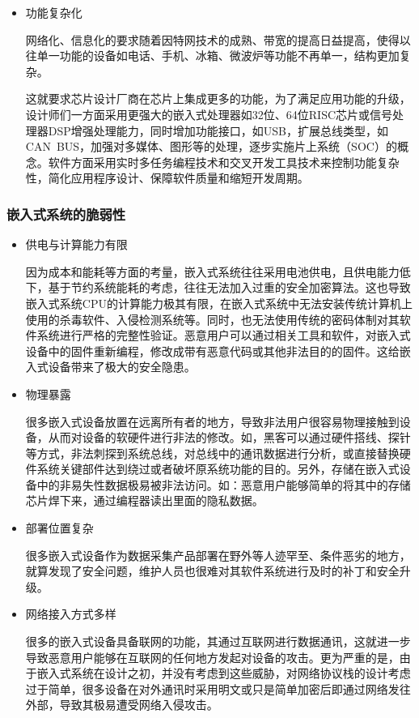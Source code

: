 \documentclass[12pt, a4paper]{article}
\begin{document}
\begin{itemize}
		\item 功能复杂化
		
		网络化、信息化的要求随着因特网技术的成熟、带宽的提高日益提高，使得以往单一功能的设备如电话、手机、冰箱、微波炉等功能不再单一，结构更加复杂。
		
		这就要求芯片设计厂商在芯片上集成更多的功能，为了满足应用功能的升级，设计师们一方面采用更强大的嵌入式处理器如32位、64位RISC芯片或信号处理器DSP增强处理能力，同时增加功能接口，如USB，扩展总线类型，如CAN BUS，加强对多媒体、图形等的处理，逐步实施片上系统（SOC）的概念。软件方面采用实时多任务编程技术和交叉开发工具技术来控制功能复杂性，简化应用程序设计、保障软件质量和缩短开发周期。
	\end{itemize}
	
	\subsubsection{嵌入式系统的脆弱性}
	\begin{itemize}
		\item 供电与计算能力有限
		
		因为成本和能耗等方面的考量，嵌入式系统往往采用电池供电，且供电能力低下，基于节约系统能耗的考虑，往往无法加入过重的安全加密算法。这也导致嵌入式系统CPU的计算能力极其有限，在嵌入式系统中无法安装传统计算机上使用的杀毒软件、入侵检测系统等。同时，也无法使用传统的密码体制对其软件系统进行严格的完整性验证。恶意用户可以通过相关工具和软件，对嵌入式设备中的固件重新编程，修改成带有恶意代码或其他非法目的的固件。这给嵌入式设备带来了极大的安全隐患。
		
		\item 物理暴露
		
		很多嵌入式设备放置在远离所有者的地方，导致非法用户很容易物理接触到设备，从而对设备的软硬件进行非法的修改。如，黑客可以通过硬件搭线、探针等方式，非法刺探到系统总线，对总线中的通讯数据进行分析，或直接替换硬件系统关键部件达到绕过或者破坏原系统功能的目的。另外，存储在嵌入式设备中的非易失性数据极易被非法访问。如：恶意用户能够简单的将其中的存储芯片焊下来，通过编程器读出里面的隐私数据。
		
		\item 部署位置复杂
		
		很多嵌入式设备作为数据采集产品部署在野外等人迹罕至、条件恶劣的地方，就算发现了安全问题，维护人员也很难对其软件系统进行及时的补丁和安全升级。
		
		\item 网络接入方式多样
		
		很多的嵌入式设备具备联网的功能，其通过互联网进行数据通讯，这就进一步导致恶意用户能够在互联网的任何地方发起对设备的攻击。更为严重的是，由于嵌入式系统在设计之初，并没有考虑到这些威胁，对网络协议栈的设计考虑过于简单，很多设备在对外通讯时采用明文或只是简单加密后即通过网络发往外部，导致其极易遭受网络入侵攻击。
	\end{itemize}
	
\end{document}
